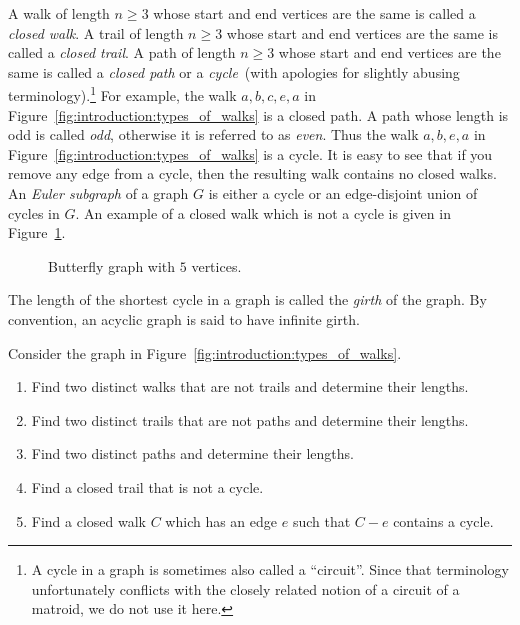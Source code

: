 A walk of length $n \geq 3$ whose start and end vertices
are the same is called a \emph{closed walk}.
A trail of length $n \geq 3$ whose start and end vertices
are the same is called a \emph{closed trail}.
A path of length $n \geq 3$ whose start and end vertices
are the same is called a \emph{closed path}
or a \emph{cycle}~(with apologies for slightly abusing
terminology).\footnote{
  A cycle in a graph is sometimes also called a
  ``circuit''. Since that terminology unfortunately
  conflicts with the closely related notion of a circuit of a matroid,
  we do not use it here.
}
For example, the walk $a, b, c, e, a$ in
Figure~\ref{fig:introduction:types_of_walks} is a closed path. A path
whose length is odd is called \emph{odd}, otherwise it
is referred to as \emph{even}. Thus the walk
$a, b, e, a$ in Figure~\ref{fig:introduction:types_of_walks} is a
cycle. It is easy to see that if you remove any edge from a cycle,
then the resulting walk contains no closed walks. An
\emph{Euler subgraph} of a graph $G$ is either a
cycle or an edge-disjoint union of cycles in $G$. An example of a
closed walk which is not a cycle is given in
Figure~\ref{fig:introduction:butterfly_graph}.

\begin{figure}[!htbp]
\centering
{}

\caption{Butterfly graph with $5$ vertices.}
\label{fig:introduction:butterfly_graph}
\end{figure}

The length of the shortest cycle in a graph is called the
\emph{girth} of the graph. By convention, an acyclic
graph is said to have infinite girth.

\begin{example}
\label{eg:introduction:walks_paths_trails}
Consider the graph in Figure~\ref{fig:introduction:types_of_walks}.
\begin{enumerate}
\item Find two distinct walks that are not trails and determine their
  lengths.

\item Find two distinct trails that are not paths and determine their
  lengths.

\item Find two distinct paths and determine their lengths.

\item Find a closed trail that is not a cycle.

\item Find a closed walk $C$ which has an edge $e$ such that $C - e$
  contains a cycle.
\end{enumerate}
\end{example}

